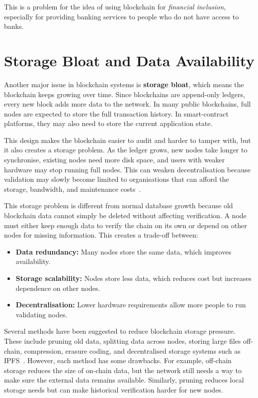 This is a problem for the idea of using blockchain for \emph{financial inclusion}, especially for providing banking services to people who do not have access to banks.

\section{Storage Bloat and Data Availability}
\label{sec:storage-bloat}

Another major issue in blockchain systems is \textbf{storage bloat}, which means the blockchain keeps growing over time. Since blockchains are append-only ledgers, every new block adds more data to the network. In many public blockchains, full nodes are expected to store the full transaction history. In smart-contract platforms, they may also need to store the current application state.

This design makes the blockchain easier to audit and harder to tamper with, but it also creates a storage problem. As the ledger grows, new nodes take longer to synchronise, existing nodes need more disk space, and users with weaker hardware may stop running full nodes. This can weaken decentralisation because validation may slowly become limited to organisations that can afford the storage, bandwidth, and maintenance costs~\cite{si2023storage}.

This storage problem is different from normal database growth because old blockchain data cannot simply be deleted without affecting verification. A node must either keep enough data to verify the chain on its own or depend on other nodes for missing information. This creates a trade-off between:
\begin{itemize}
    \item \textbf{Data redundancy:} Many nodes store the same data, which improves availability.
    \item \textbf{Storage scalability:} Nodes store less data, which reduces cost but increases dependence on other nodes.
    \item \textbf{Decentralisation:} Lower hardware requirements allow more people to run validating nodes.
\end{itemize}

Several methods have been suggested to reduce blockchain storage pressure. These include pruning old data, splitting data across nodes, storing large files off-chain, compression, erasure coding, and decentralised storage systems such as IPFS~\cite{alzoubi2024bloat,wang2024storage}. However, each method has some drawbacks. For example, off-chain storage reduces the size of on-chain data, but the network still needs a way to make sure the external data remains available. Similarly, pruning reduces local storage needs but can make historical verification harder for new nodes.

